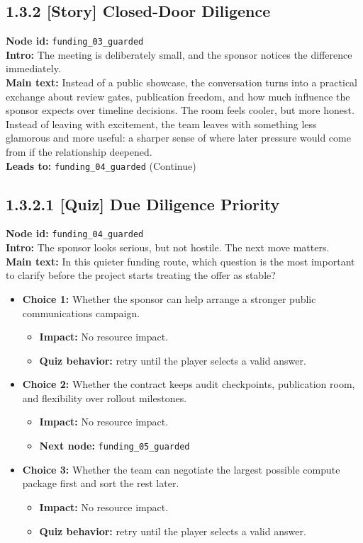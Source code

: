 \documentclass[11pt]{article}
\begin{document}
\subsection*{1.3.2 [Story] Closed-Door Diligence}
\textbf{Node id:} \texttt{funding\_03\_guarded}\\
\textbf{Intro:} The meeting is deliberately small, and the sponsor notices the difference immediately.\\
\textbf{Main text:} Instead of a public showcase, the conversation turns into a practical exchange about review gates, publication freedom, and how much influence the sponsor expects over timeline decisions. The room feels cooler, but more honest. Instead of leaving with excitement, the team leaves with something less glamorous and more useful: a sharper sense of where later pressure would come from if the relationship deepened.\\
\textbf{Leads to:} \texttt{funding\_04\_guarded} (Continue)\\
\subsection*{1.3.2.1 [Quiz] Due Diligence Priority}
\textbf{Node id:} \texttt{funding\_04\_guarded}\\
\textbf{Intro:} The sponsor looks serious, but not hostile. The next move matters.\\
\textbf{Main text:} In this quieter funding route, which question is the most important to clarify before the project starts treating the offer as stable?\\
\begin{itemize}
\item \textbf{Choice 1:} Whether the sponsor can help arrange a stronger public communications campaign.
\begin{itemize}
\item \textbf{Impact:} No resource impact.
\item \textbf{Quiz behavior:} retry until the player selects a valid answer.
\end{itemize}
\item \textbf{Choice 2:} Whether the contract keeps audit checkpoints, publication room, and flexibility over rollout milestones.
\begin{itemize}
\item \textbf{Impact:} No resource impact.
\item \textbf{Next node:} \texttt{funding\_05\_guarded}
\end{itemize}
\item \textbf{Choice 3:} Whether the team can negotiate the largest possible compute package first and sort the rest later.
\begin{itemize}
\item \textbf{Impact:} No resource impact.
\item \textbf{Quiz behavior:} retry until the player selects a valid answer.
\end{itemize}
\end{itemize}
\end{document}
